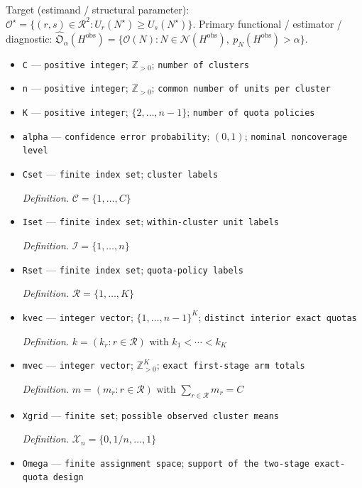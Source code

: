 \documentclass{article}
\begin{document}
Target (estimand / structural parameter): \(\mathcal O^\star=\{(r,s)\in\mathcal R^2:U_r(N^\star)\ge U_s(N^\star)\}\).
Primary functional / estimator / diagnostic: \(\widehat{\mathfrak O}_{\alpha}(H^{\mathrm{obs}})=\{\mathcal O(N):N\in\mathcal N(H^{\mathrm{obs}}),\ p_N(H^{\mathrm{obs}})>\alpha\}\).
\begin{itemize}
  \item \texttt{C} --- \texttt{positive integer}; \(\mathbb Z_{>0}\); \texttt{number of clusters}
  \item \texttt{n} --- \texttt{positive integer}; \(\mathbb Z_{>0}\); \texttt{common number of units per cluster}
  \item \texttt{K} --- \texttt{positive integer}; \(\{2,\ldots,n-1\}\); \texttt{number of quota policies}
  \item \texttt{alpha} --- \texttt{confidence error probability}; \((0,1)\); \texttt{nominal noncoverage level}
  \item \texttt{Cset} --- \texttt{finite index set}; \texttt{cluster labels}
  \par\smallskip\noindent\emph{Definition.} \(\mathcal C=\{1,\ldots,C\}\)
  \item \texttt{Iset} --- \texttt{finite index set}; \texttt{within-\allowbreak{}cluster unit labels}
  \par\smallskip\noindent\emph{Definition.} \(\mathcal I=\{1,\ldots,n\}\)
  \item \texttt{Rset} --- \texttt{finite index set}; \texttt{quota-\allowbreak{}policy labels}
  \par\smallskip\noindent\emph{Definition.} \(\mathcal R=\{1,\ldots,K\}\)
  \item \texttt{kvec} --- \texttt{integer vector}; \(\{1,\ldots,n-1\}^{K}\); \texttt{distinct interior exact quotas}
  \par\smallskip\noindent\emph{Definition.} \(k=(k_r:r\in\mathcal R)\text{ with }k_1<\cdots<k_K\)
  \item \texttt{mvec} --- \texttt{integer vector}; \(\mathbb Z_{>0}^{K}\); \texttt{exact first-\allowbreak{}stage arm totals}
  \par\smallskip\noindent\emph{Definition.} \(m=(m_r:r\in\mathcal R)\text{ with }\sum_{r\in\mathcal R}m_r=C\)
  \item \texttt{Xgrid} --- \texttt{finite set}; \texttt{possible observed cluster means}
  \par\smallskip\noindent\emph{Definition.} \(\mathcal X_n=\{0,1/n,\ldots,1\}\)
  \item \texttt{Omega} --- \texttt{finite assignment space}; \texttt{support of the two-\allowbreak{}stage exact-\allowbreak{}quota design}

\end{itemize}
\end{document}
